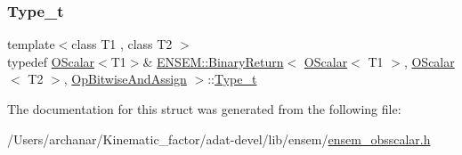 \mbox{\label{structENSEM_1_1BinaryReturn_3_01OScalar_3_01T1_01_4_00_01OScalar_3_01T2_01_4_00_01OpBitwiseAndAssign_01_4_a113164aa69cac863b97d72236eb744cb}} 
\subsubsection{\texorpdfstring{Type\_t}{Type\_t}\hspace{0.1cm}{\footnotesize\ttfamily [3/3]}}
{\footnotesize\ttfamily template$<$class T1 , class T2 $>$ \\
typedef \mbox{\hyperlink{classENSEM_1_1OScalar}{O\+Scalar}}$<$T1$>$\& \mbox{\hyperlink{structENSEM_1_1BinaryReturn}{E\+N\+S\+E\+M\+::\+Binary\+Return}}$<$ \mbox{\hyperlink{classENSEM_1_1OScalar}{O\+Scalar}}$<$ T1 $>$, \mbox{\hyperlink{classENSEM_1_1OScalar}{O\+Scalar}}$<$ T2 $>$, \mbox{\hyperlink{structENSEM_1_1OpBitwiseAndAssign}{Op\+Bitwise\+And\+Assign}} $>$\+::\mbox{\hyperlink{structENSEM_1_1BinaryReturn_3_01OScalar_3_01T1_01_4_00_01OScalar_3_01T2_01_4_00_01OpBitwiseAndAssign_01_4_a113164aa69cac863b97d72236eb744cb}{Type\+\_\+t}}}



The documentation for this struct was generated from the following file\+:\begin{DoxyCompactItemize}
\item 
/\+Users/archanar/\+Kinematic\+\_\+factor/adat-\/devel/lib/ensem/\mbox{\hyperlink{adat-devel_2lib_2ensem_2ensem__obsscalar_8h}{ensem\+\_\+obsscalar.\+h}}\end{DoxyCompactItemize}
